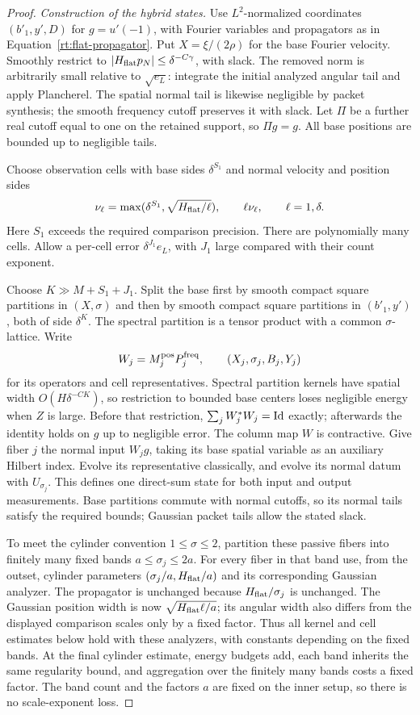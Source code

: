 \begin{proof}
\emph{Construction of the hybrid states.}
Use $L^2$-normalized coordinates $(b'_1,y',D)$ for
$g=u'(-1)$, with Fourier variables and propagators as in
Equation~\eqref{rt:flat-propagator}.  Put $X=\xi/(2\rho)$ for the
base Fourier velocity.
Smoothly restrict to $|H_{\rm flat}p_N|\le\delta^{-C\gamma}$,
with slack.  The removed norm is arbitrarily small relative to
$\sqrt{e_L}$: integrate the initial analyzed angular tail and apply
Plancherel.  The spatial normal tail is likewise negligible by packet
synthesis; the smooth frequency cutoff preserves it with slack.
Let $\Pi$ be a further real cutoff equal to one on the retained support,
so $\Pi g=g$.  All base positions are bounded up to negligible tails.

Choose observation cells with base sides $\delta^{S_1}$ and normal
velocity and position sides
\[
 \nu_\ell=\max(\delta^{S_1},\sqrt{H_{\rm flat}/\ell}),
 \qquad \ell\nu_\ell,\qquad \ell=1,\delta.
\]
Here $S_1$ exceeds the required comparison precision.  There are
polynomially many cells.  Allow a per-cell error $\delta^{J_1}e_L$,
with $J_1$ large compared with their count exponent.

Choose $K\gg M+S_1+J_1$.  Split the base first by smooth compact
square partitions in $(X,\sigma)$ and then by smooth compact square
partitions in $(b'_1,y')$, both of side $\delta^K$.
The spectral partition is a tensor product with a common
$\sigma$-lattice.  Write
\[
 W_j=M_j^{\rm pos}P_j^{\rm freq},\qquad
 (X_j,\sigma_j,B_j,Y_j)
\]
for its operators and cell representatives.  Spectral partition kernels
have spatial width $O(H\delta^{-CK})$, so restriction to bounded base
centers loses negligible energy when $Z$ is large.  Before that
restriction, $\sum_jW_j^*W_j=\mathrm{Id}$ exactly; afterwards the identity holds
on $g$ up to negligible error.  The column map $W$ is contractive.
Give fiber $j$ the normal input $W_jg$, taking its base spatial variable
as an auxiliary Hilbert index.  Evolve its representative classically,
and evolve its normal datum with $U_{\sigma_j}$.  This defines one
direct-sum state for both input and output measurements.  Base partitions
commute with normal cutoffs, so its normal tails satisfy the required
bounds; Gaussian packet tails allow the stated slack.

To meet the cylinder convention $1\le\sigma\le2$, partition these
passive fibers into finitely many fixed bands $a\le\sigma_j\le2a$.
For every fiber in that band use, from the outset, cylinder parameters
$(\sigma_j/a,H_{\rm flat}/a)$ and its corresponding Gaussian analyzer.
The propagator is unchanged because $H_{\rm flat}/\sigma_j$ is
unchanged.  The Gaussian position width is now
$\sqrt{H_{\rm flat}\ell/a}$; its angular width also differs from the
displayed comparison scales only by a fixed factor.  Thus all kernel
and cell estimates below hold with these analyzers, with constants
depending on the fixed bands.  At the final cylinder estimate, energy
budgets add, each band inherits the same regularity bound, and
aggregation over the finitely many bands costs a fixed factor.
The band count and the factors $a$ are fixed on the inner setup, so
there is no scale-exponent loss.


\end{proof}
